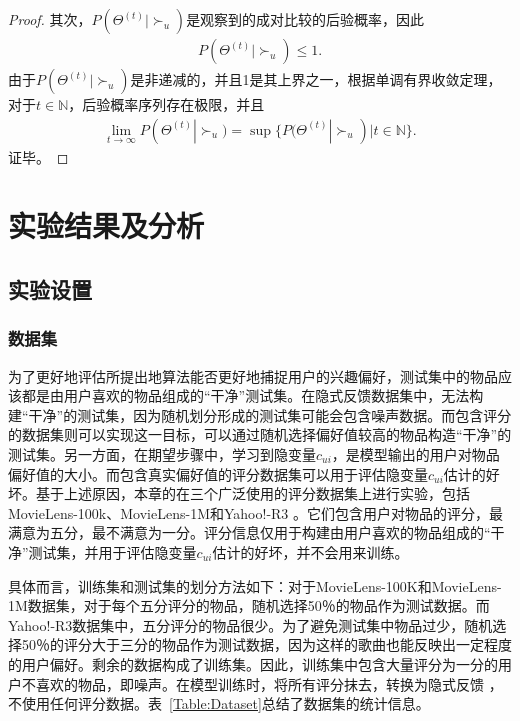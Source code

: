 \begin{proof}
\par
其次，$P({\Theta ^{(t)}}|{ \succ _u})$是观察到的成对比较的后验概率，因此
\begin{equation}\label{eq28}
	\begin{split}
		P({\Theta ^{(t)}}|{ \succ _u})\le 1.
	\end{split}
\end{equation}
由于$P({\Theta ^{(t)}}|{ \succ _u})$是非递减的，并且1是其上界之一，根据单调有界收敛定理，对于$t \in \mathbb{N}$，后验概率序列存在极限，并且
\begin{equation}\label{eq28}
	\begin{split}
		\mathop {\lim }\limits_{t \to \infty } P({\Theta ^{(t)}}|{ \succ _u}) = \sup \{ P({\Theta ^{(t)}}|{ \succ _u})| t \in \mathbb{N}\}.
	\end{split}
\end{equation}
证毕。
\end{proof}

\section{实验结果及分析}
\subsection{实验设置}
\subsubsection{数据集}
为了更好地评估所提出地算法能否更好地捕捉用户的兴趣偏好，测试集中的物品应该都是由用户喜欢的物品组成的“干净”测试集。在隐式反馈数据集中，无法构建“干净”的测试集，因为随机划分形成的测试集可能会包含噪声数据。而包含评分的数据集则可以实现这一目标，可以通过随机选择偏好值较高的物品构造“干净”的测试集。另一方面，在期望步骤中，学习到隐变量$c_{ui}$，是模型输出的用户对物品偏好值的大小。而包含真实偏好值的评分数据集可以用于评估隐变量$c_{ui}$估计的好坏。基于上述原因，本章的在三个广泛使用的评分数据集上进行实验，包括MovieLens-100k、MovieLens-1M和Yahoo!-R3 \cite{Xuejiao:2020:ASC}。它们包含用户对物品的评分，最满意为五分，最不满意为一分。评分信息仅用于构建由用户喜欢的物品组成的“干净”测试集，并用于评估隐变量$c_{ui}$估计的好坏，并不会用来训练。

具体而言，训练集和测试集的划分方法如下：对于MovieLens-100K和MovieLens-1M数据集，对于每个五分评分的物品，随机选择50％的物品作为测试数据。而Yahoo!-R3数据集中，五分评分的物品很少。为了避免测试集中物品过少，随机选择50％的评分大于三分的物品\cite{Wang:2021:WSDM}作为测试数据，因为这样的歌曲也能反映出一定程度的用户偏好。剩余的数据构成了训练集。因此，训练集中包含大量评分为一分的用户不喜欢的物品，即噪声。在模型训练时，将所有评分抹去，转换为隐式反馈 \cite{Steffen:2009:UAI,Zhao:2019:FGCS,Yu:2018:CIKM}，不使用任何评分数据。表~\ref{Table:Dataset}总结了数据集的统计信息。

